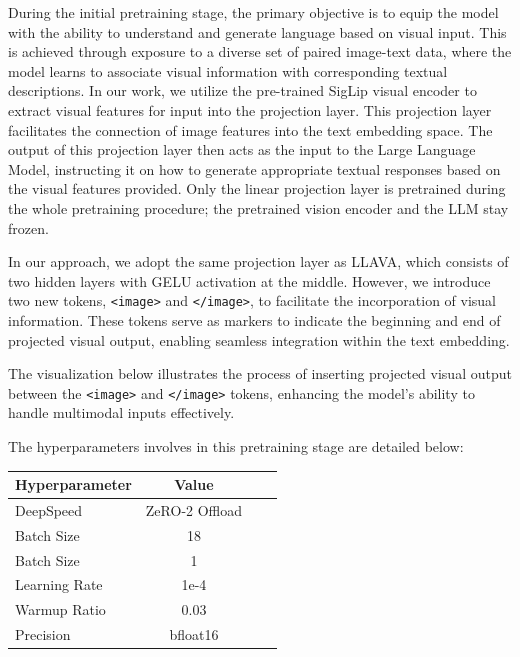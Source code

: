 \documentclass[preprint]{article}
\begin{document}
During the initial pretraining stage, the primary objective is to equip the model with the ability to understand and generate language based on visual input. This is achieved through exposure to a diverse set of paired image-text data, where the model learns to associate visual information with corresponding textual descriptions. In our work, we utilize the pre-trained SigLip visual encoder to extract visual features for input into the projection layer. This projection layer facilitates the connection of image features into the text embedding space. The output of this projection layer then acts as the input to the Large Language Model, instructing it on how to generate appropriate textual responses based on the visual features provided. Only the linear projection layer is pretrained during the whole pretraining procedure; the pretrained vision encoder and the LLM stay frozen.

In our approach, we adopt the same projection layer as LLAVA, which consists of two hidden layers with GELU activation at the middle. However, we introduce two new tokens, \texttt{<image>} and \texttt{</image>}, to facilitate the incorporation of visual information. These tokens serve as markers to indicate the beginning and end of projected visual output, enabling seamless integration within the text embedding.

The visualization below illustrates the process of inserting projected visual output between the \texttt{<image>} and \texttt{</image>} tokens, enhancing the model's ability to handle multimodal inputs effectively.

The hyperparameters involves in this pretraining stage are detailed below:

\begin{table}[h]
  \centering
  \begin{tabular}{lccl}
    \hline
    \textbf{Hyperparameter} & \textbf{Value} \\
    \hline
    DeepSpeed               & ZeRO-2 Offload \\
    Batch Size              & 18             \\
    Batch Size              & 1              \\
    Learning Rate           & 1e-4           \\
    Warmup Ratio            & 0.03           \\
    Precision               & bfloat16       \\
    \hline
  \end{tabular}
\end{table}
\end{document}
